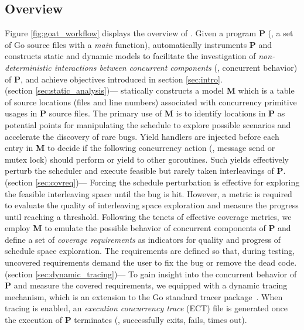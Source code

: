 \subsection{Overview}
\label{sec:overview}
Figure \ref{fig:goat_workflow} displays the overview of \goat.
%
Given a program \textbf{P} (\ie, a set of Go source files with a \textit{main} function), \goat automatically instruments \textbf{P} and constructs static and dynamic models to facilitate the investigation of \textit{non-deterministic interactions between concurrent components} (\ie, concurrent behavior) of \textbf{P}, and achieve objectives introduced in section \ref{sec:intro}.
%
\\
 (section \ref{sec:static_analysis})---
\goat statically constructs a model \textbf{M} which is a table of source locations (files and line numbers) associated with concurrency primitive usages in \textbf{P} source files.
%
The primary use of \textbf{M} is to identify locations in \textbf{P} as potential points for manipulating the schedule to explore possible scenarios and accelerate the discovery of rare bugs.
%
Yield handlers are injected before each entry in \textbf{M} to decide if the following concurrency action (\eg, message send or mutex lock) should perform or yield to other goroutines.
%
Such yields effectively perturb the scheduler and execute feasible but rarely taken interleavings of \textbf{P}.
%
\\
 (section \ref{sec:covreq})---
Forcing the schedule perturbation is effective for exploring the feasible interleaving space until the bug is hit.
%
However, a metric is required to evaluate the quality of interleaving space exploration and measure the progress until reaching a threshold.
%
Following the tenets of effective coverage metrics, we employ \textbf{M} to emulate the possible behavior of concurrent components of \textbf{P} and define a set of \textit{coverage requirements} as indicators for quality and progress of schedule space exploration.
%
The requirements are defined so that, during testing, uncovered requirements demand the user to fix the bug or remove the dead code.
\\
 (section \ref{sec:dynamic_tracing})---
To gain insight into the concurrent behavior of \textbf{P} and measure the covered requirements, we equipped \goat with a dynamic tracing mechanism, which is an extension to the Go standard tracer package~\cite{go-cmd-trace}.
%
When tracing is enabled, an \textit{execution concurrency trace} (ECT) file is generated once the execution of \textbf{P} terminates (\eg, successfully exits, fails, times out).
